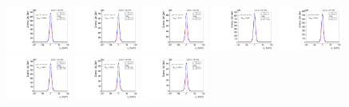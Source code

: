 \begin{figure}[htb]
\includegraphics[width=0.19\textwidth]{plots/Appendix_Recoil_Fits/WmpMC_PF_5TeV_2G/pfu2fit_16.pdf}
\includegraphics[width=0.19\textwidth]{plots/Appendix_Recoil_Fits/WmpMC_PF_5TeV_2G/pfu2fit_17.pdf}
\includegraphics[width=0.19\textwidth]{plots/Appendix_Recoil_Fits/WmpMC_PF_5TeV_2G/pfu2fit_18.pdf}
\includegraphics[width=0.19\textwidth]{plots/Appendix_Recoil_Fits/WmpMC_PF_5TeV_2G/pfu2fit_19.pdf}
\includegraphics[width=0.19\textwidth]{plots/Appendix_Recoil_Fits/WmpMC_PF_5TeV_2G/pfu2fit_20.pdf}
\includegraphics[width=0.19\textwidth]{plots/Appendix_Recoil_Fits/WmpMC_PF_5TeV_2G/pfu2fit_21.pdf}
\includegraphics[width=0.19\textwidth]{plots/Appendix_Recoil_Fits/WmpMC_PF_5TeV_2G/pfu2fit_22.pdf}
\includegraphics[width=0.19\textwidth]{plots/Appendix_Recoil_Fits/WmpMC_PF_5TeV_2G/pfu2fit_23.pdf}

\end{figure}
